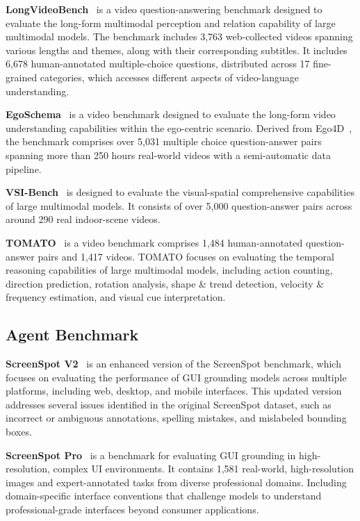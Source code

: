 \documentclass{article}
\newcommand{\citep}[1]{\parencite{#1}}
\begin{document}
\textbf{LongVideoBench}~\citep{nips2024longvideobench} is a video question-answering benchmark designed to evaluate the long-form multimodal perception and relation capability of large multimodal models. The benchmark includes 3,763 web-collected videos spanning various lengths and themes, along with their corresponding subtitles. It includes 6,678 human-annotated multiple-choice questions, distributed across 17 fine-grained categories, which accesses different aspects of video-language understanding.

\textbf{EgoSchema}~\citep{nips2023egoschema} is a video benchmark designed to evaluate the long-form video understanding capabilities within the ego-centric scenario. Derived from Ego4D~\citep{cvpr2022ego4d}, the benchmark comprises over 5,031 multiple choice question-answer pairs spanning more than 250 hours real-world videos with a semi-automatic data pipeline. 

\textbf{VSI-Bench}~\citep{arxiv2024vsibench} is designed to evaluate the visual-spatial comprehensive capabilities of large multimodal models. It consists of over 5,000 question-answer pairs across around 290 real indoor-scene videos. 

\textbf{TOMATO}~\citep{iclr2025tomato} is a video benchmark comprises 1,484 human-annotated question-answer pairs and 1,417 videos. TOMATO focuses on evaluating the temporal reasoning capabilities of large multimodal models, including action counting, direction prediction, rotation analysis, shape \& trend detection, velocity \& frequency estimation, and visual cue interpretation.


\subsection{Agent Benchmark}
\textbf{ScreenSpot V2}~\citep{wu2024osatlas} is an enhanced version of the ScreenSpot \citep{cheng2024seeclick} benchmark, which focuses on evaluating the performance of GUI grounding models across multiple platforms, including web, desktop, and mobile interfaces. This updated version addresses several issues identified in the original ScreenSpot dataset, such as incorrect or ambiguous annotations, spelling mistakes, and mislabeled bounding boxes.

\textbf{ScreenSpot Pro}~\citep{li2025screenspotpro} is a benchmark for evaluating GUI grounding in high-resolution, complex UI environments. It contains 1,581 real-world, high-resolution images and expert-annotated tasks from diverse professional domains. Including domain-specific interface conventions that challenge models to understand professional-grade interfaces beyond consumer applications.
\end{document}
